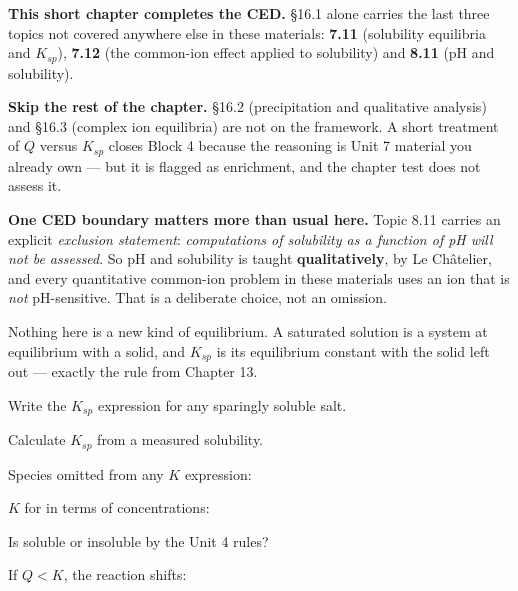 \documentclass{apchem-notes}
\begin{document}
\apctitleblock

\begin{apcnote}
\textbf{This short chapter completes the CED.} \S16.1 alone carries the last
three topics not covered anywhere else in these materials:
\textbf{7.11} (solubility equilibria and $K_{sp}$), \textbf{7.12} (the
common-ion effect applied to solubility) and \textbf{8.11} (pH and
solubility).

\textbf{Skip the rest of the chapter.} \S16.2 (precipitation and qualitative
analysis) and \S16.3 (complex ion equilibria) are not on the framework.
A short treatment of $Q$ versus $K_{sp}$ closes Block 4 because the
reasoning is Unit 7 material you already own --- but it is flagged as
enrichment, and the chapter test does not assess it.

\textbf{One CED boundary matters more than usual here.} Topic 8.11 carries
an explicit \emph{exclusion statement}: \emph{computations of solubility as
a function of pH will not be assessed}. So pH and solubility is taught
\textbf{qualitatively}, by Le Ch\^atelier, and every quantitative
common-ion problem in these materials uses an ion that is \emph{not}
pH-sensitive. That is a deliberate choice, not an omission.

Nothing here is a new kind of equilibrium. A saturated solution is a
system at equilibrium with a solid, and $K_{sp}$ is its equilibrium
constant with the solid left out --- exactly the rule from Chapter 13.
\end{apcnote}


\begin{objectives}
  \item Write the $K_{sp}$ expression for any sparingly soluble salt.
  \item Calculate $K_{sp}$ from a measured solubility.
\end{objectives}


\begin{warmup}[4]
  \item Species omitted from any $K$ expression:
  \item $K$ for  in terms of concentrations:
  \item Is  soluble or insoluble by the Unit 4 rules?
  \item If $Q < K$, the reaction shifts: 
\end{warmup}
\end{document}
